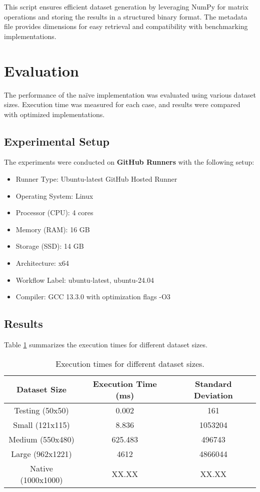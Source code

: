 \documentclass[12pt]{article}
\begin{document}
This script ensures efficient dataset generation by leveraging NumPy for matrix operations and storing the results in a structured binary format. The metadata file provides dimensions for easy retrieval and compatibility with benchmarking implementations.

\section{Evaluation}
The performance of the naïve implementation was evaluated using various dataset sizes. Execution time was measured for each case, and results were compared with optimized implementations.

\subsection{Experimental Setup}
The experiments were conducted on \textbf{GitHub Runners} with the following setup:
\begin{itemize}
    \item Runner Type: Ubuntu-latest GitHub Hosted Runner
    \item Operating System: Linux
    \item Processor (CPU): 4 cores
    \item Memory (RAM): 16 GB
    \item Storage (SSD): 14 GB
    \item Architecture: x64
    \item Workflow Label: ubuntu-latest, ubuntu-24.04
    \item Compiler: GCC 13.3.0 with optimization flags -O3
\end{itemize}

\subsection{Results}
Table \ref{tab:results} summarizes the execution times for different dataset sizes.

\begin{table}[h]
    \begin{tabular}{|c|c|c|}
        \hline
        \textbf{Dataset Size} & \textbf{Execution Time (ms)} & \textbf{Standard Deviation} \\
        \hline
        Testing (50x50) & 0.002 & 161 \\
        Small (121x115) & 8.836 & 1053204 \\
        Medium (550x480) & 625.483 & 496743 \\
        Large (962x1221) & 4612 & 4866044 \\
        Native (1000x1000) & XX.XX & XX.XX \\
        \hline
    \end{tabular}
        \caption{Execution times for different dataset sizes.}
        \label{tab:results}
    \end{table}
\end{document}

